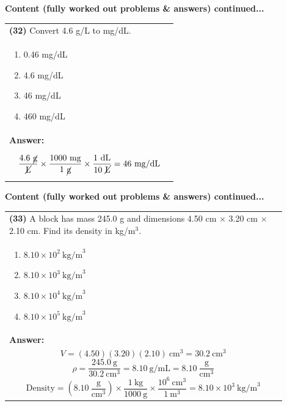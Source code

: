 \documentclass{article}
\begin{document}
{\newpage
\noindent
{\large\textbf{Content (fully worked out problems \& answers) continued...}}\\[0.2em]
\vspace{0.2cm}
\begin{tabular}{|p{0.9\linewidth}|}
\hline
\vspace{0.2cm}
\textbf{(32)} Convert 4.6 g/L to mg/dL.\\
\begin{minipage}[t]{0.85\linewidth}
\begin{enumerate}[label=\alph*.]
   \item 0.46 mg/dL \
   \item 4.6 mg/dL \
   \item 46 mg/dL \
   \item 460 mg/dL
\end{enumerate}
\end{minipage}\\
\hline
\vspace{0.2cm}
\textbf{Answer:}\\
\[
\frac{4.6~\cancel{\text{g}}}{\cancel{\text{L}}}\times\frac{1000~\text{mg}}{1~\cancel{\text{g}}}\times\frac{1~\text{dL}}{10~\cancel{\text{L}}}=46~\text{mg/dL}
\] \\
\hline
\end{tabular}

\newpage
\noindent
{\large\textbf{Content (fully worked out problems \& answers) continued...}}\\[0.2em]
\vspace{0.2cm}
\begin{tabular}{|p{0.9\linewidth}|}
\hline
\vspace{0.2cm}
\textbf{(33)} A block has mass 245.0 g and dimensions 4.50 cm $\times$ 3.20 cm $\times$ 2.10 cm. Find its density in kg/m$^3$.\\
\begin{minipage}[t]{0.85\linewidth}
\begin{enumerate}[label=\alph*.]
   \item $8.10\times10^{2}~\text{kg/m}^3$ \
   \item $8.10\times10^{3}~\text{kg/m}^3$ \
   \item $8.10\times10^{4}~\text{kg/m}^3$ \
   \item $8.10\times10^{5}~\text{kg/m}^3$
\end{enumerate}
\end{minipage}\\
\hline
\vspace{0.2cm}
\textbf{Answer:}\\
\[
V=(4.50)(3.20)(2.10)~\text{cm}^3=30.2~\text{cm}^3
\]
\[
\rho=\frac{245.0~\text{g}}{30.2~\text{cm}^3}=8.10~\text{g/mL}=8.10~\frac{\text{g}}{\text{cm}^3}
\]
\[
\text{Density}=\left(8.10~\frac{\text{g}}{\text{cm}^3}\right)\times\frac{1~\text{kg}}{1000~\text{g}}\times\frac{10^6~\text{cm}^3}{1~\text{m}^3}=8.10\times10^{3}~\text{kg/m}^3
\] \\
\hline
\end{tabular}

}
\end{document}
